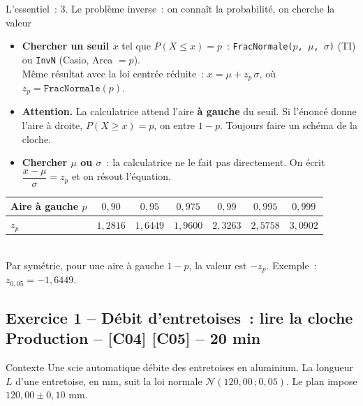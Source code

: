 \documentclass[a4paper,11pt]{article}
\newcommand{\duree}[1]{\hfill{\normalsize\color{uimmred}#1}}
\begin{document}
\begin{rappel}{L'essentiel~: 3. Le problème inverse~: on connaît la probabilité, on cherche la valeur}
\begin{itemize}[leftmargin=12pt, itemsep=3pt, topsep=2pt]
  \item \textbf{Chercher un seuil $x$} tel que $P(X \leq x) = p$~: \texttt{FracNormale($p$, $\mu$, $\sigma$)} (TI) ou \texttt{InvN} (Casio, Area $=p$).\\
  Même résultat avec la loi centrée réduite~: $x = \mu + z_p\,\sigma$, où $z_p = \texttt{FracNormale}(p)$.
  \item {\color{uimmred}\textbf{Attention.}} La calculatrice attend l'aire \textbf{à gauche} du seuil. Si l'énoncé donne l'aire à droite, $P(X \geq x) = p$, on entre $1 - p$. Toujours faire un schéma de la cloche.
  \item \textbf{Chercher $\mu$ ou $\sigma$}~: la calculatrice ne le fait pas directement. On écrit $\dfrac{x - \mu}{\sigma} = z_p$ et on résout l'équation.
\end{itemize}
\begin{center}\small
\renewcommand{\arraystretch}{1.2}
\begin{tabular}{|l|*{6}{c|}}\hline
Aire à gauche $p$ & $0{,}90$ & $0{,}95$ & $0{,}975$ & $0{,}99$ & $0{,}995$ & $0{,}999$ \\ \hline
$z_p$ & $1{,}2816$ & $1{,}6449$ & $1{,}9600$ & $2{,}3263$ & $2{,}5758$ & $3{,}0902$ \\ \hline
\end{tabular}\\[3pt]
Par symétrie, pour une aire à gauche $1-p$, la valeur est $-z_p$. Exemple~: $z_{0{,}05} = -1{,}6449$.
\end{center}
\end{rappel}

\newpage
\subsection{Exercice 1 -- Débit d'entretoises~: lire la cloche \duree{Production -- [C04] [C05] -- 20 min}}

\begin{exo}{Contexte}
Une scie automatique débite des entretoises en aluminium. La longueur $L$ d'une entretoise, en mm, suit la loi normale $\mathcal{N}(120{,}00\,;0{,}05)$. Le plan impose $120{,}00 \pm 0{,}10$ mm.
\end{exo}
\end{document}
